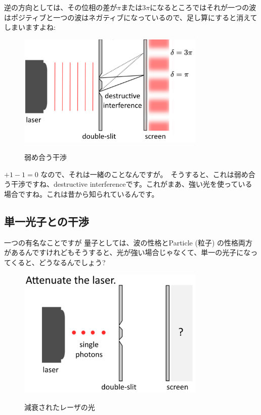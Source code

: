 逆の方向としては、その位相の差が$\pi$または$3\pi$になるところではそれが一つの波はポジティブと一つの波はネガティブになっているので、足し算にすると消えてしまいますよね:
\begin{figure}[H]
   \centering
    \includegraphics[width=0.8\textwidth]{lesson6/double_slit_destructive.pdf}
    \label{fig: 1}
    \begin{center}
        \caption{弱め合う干渉}
    \end{center}
\end{figure}
$+1-1=0$ なので、それは一緒のことなんですが。　そうすると、これは弱め合う干渉ですね、destructive interferenceです。これがまあ、強い光を使っている場合ですね。これは昔から知られているんです。



\subsection{単一光子との干渉}
一つの有名なことですが
量子としては、波の性格とParticle (粒子) の性格両方があるんですけれどもそうすると、光が強い場合じゃなくて、単一の光子になってくると、どうなるんでしょう?
\begin{figure}[H]
   \centering
    \includegraphics[width=0.8\textwidth]{lesson6/attenuate_laser.pdf}
    \label{fig: 1}
    \begin{center}
        \caption{減衰されたレーザの光}
    \end{center}
\end{figure}

